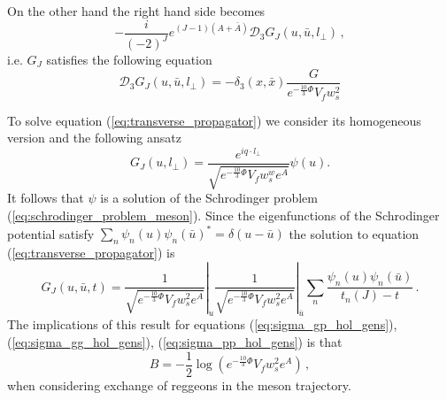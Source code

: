 \documentclass[a4paper,12pt]{article}
\begin{document}
On the other hand the right hand side becomes
\begin{equation}
- \frac{i}{{\left(-2\right)}^J} e^{\left(J-1\right)\left(A+\bar{A}\right)} \mathcal{D}_3 G_J \left(u, \bar{u}, l_\perp\right) \, ,
\end{equation}
i.e. $G_J$ satisfies the following equation
\begin{equation}
\mathcal{D}_3 G_J \left(u, \bar{u}, l_\perp\right) = - \delta_3 \left(x, \bar{x}\right) \frac{G}{e^{-\frac{10}{3} \Phi} V_f w_s^2}
\label{eq:transverse_propagator}
\end{equation}

To solve equation (\ref{eq:transverse_propagator}) we consider its homogeneous version and the following ansatz
\begin{equation}
G_J\left(u, l_\perp\right) = \frac{e^{i q \cdot l_\perp}}{\sqrt{e^{-\frac{10}{3}\Phi}V_f w_s^w e^{A}}} \psi\left(u\right).
\end{equation}
It follows that $\psi$ is a solution of the Schrodinger problem (\ref{eq:schrodinger_problem_meson}).
Since the eigenfunctions of the Schrodinger potential satisfy $\sum_n \psi_n (u) {\psi_n (\bar{u})}^* = \delta(u - \bar{u})$
the solution to equation (\ref{eq:transverse_propagator}) is
\begin{equation}
G_J \left(u, \bar{u}, t \right) = \left. \frac{1}{\sqrt{e^{-\frac{10}{3}\Phi}V_f w_s^2 e^A}}\right|_u  \left.\frac{1}{\sqrt{e^{-\frac{10}{3}\Phi}V_f w_s^2 e^A}}\right|_{\bar{u}}  \sum_n \frac{\psi_n\left(u\right) \psi_n \left(\bar{u}\right)}{t_n\left(J\right) - t} \, .
\end{equation}
The implications of this result for equations (\ref{eq:sigma_gp_hol_gens}), (\ref{eq:sigma_gg_hol_gens}), (\ref{eq:sigma_pp_hol_gens}) is that 
\begin{equation}
B = - \frac{1}{2} \log\left( e^{-\frac{10}{3}\Phi}V_f w_s^2 e^A \right) \, ,
\end{equation}
when considering exchange of reggeons in the meson trajectory.
\end{document}
